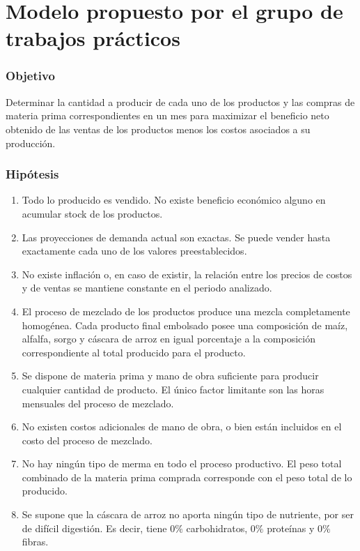\documentclass[a4paper,11pt]{article}
\begin{document}
\tableofcontents
\clearpage

\part{Modelo propuesto por el grupo de trabajos prácticos}

\section{Objetivo}

Determinar la cantidad a producir de cada uno de los productos y las compras de
materia prima correspondientes en un mes para maximizar el beneficio neto
obtenido de las ventas de los productos menos los costos asociados a su
producción.

\section{Hipótesis}

\begin{enumerate}

  \item Todo lo producido es vendido. No existe beneficio económico alguno en
    acumular stock de los productos.

  \item Las proyecciones de demanda actual son exactas. Se puede vender hasta
    exactamente cada uno de los valores preestablecidos.

  \item No existe inflación o, en caso de existir, la relación entre los
    precios de costos y de ventas se mantiene constante en el periodo
    analizado.

  \item El proceso de mezclado de los productos produce una mezcla
    completamente homogénea. Cada producto final embolsado posee una
    composición de maíz, alfalfa, sorgo y cáscara de arroz en igual porcentaje
    a la composición correspondiente al total producido para el producto.

  \item Se dispone de materia prima y mano de obra suficiente para producir
    cualquier cantidad de producto. El único factor limitante son las horas
    mensuales del proceso de mezclado.

  \item No existen costos adicionales de mano de obra, o bien están incluidos
    en el costo del proceso de mezclado.

  \item No hay ningún tipo de merma en todo el proceso productivo. El peso
    total combinado de la materia prima comprada corresponde con el peso total
    de lo producido.

  \item Se supone que la cáscara de arroz no aporta ningún tipo de nutriente,
    por ser de difícil digestión. Es decir, tiene \(0\%\) carbohidratos,
    \(0\%\) proteínas y \(0\%\) fibras.

\end{enumerate}
\end{document}

